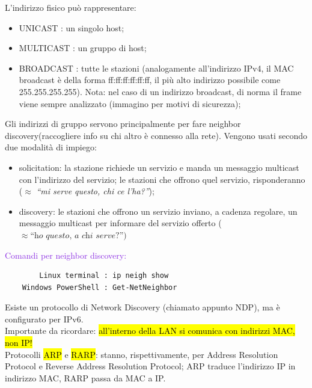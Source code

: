 \noindent L'indirizzo fisico può rappresentare:
\begin{itemize}
    \item UNICAST : un singolo host;
    \item MULTICAST : un gruppo di host;
    \item BROADCAST : tutte le stazioni (analogamente all'indirizzo IPv4, il MAC broadcast è della forma ff:ff:ff:ff:ff:ff, il più alto indirizzo possibile come 255.255.255.255). Nota: nel caso di un indirizzo broadcast, di norma il frame viene sempre analizzato (immagino per motivi di sicurezza);
\end{itemize}

\noindent Gli indirizzi di gruppo servono principalmente per fare neighbor discovery(raccogliere info su chi altro è connesso alla rete). Vengono usati secondo due modalità di impiego:
\begin{itemize}
    \item solicitation: la stazione richiede un servizio e manda un messaggio multicast con l'indirizzo del servizio; le stazioni che offrono quel servizio, risponderanno ($\approx$ \textit{``mi serve questo, chi ce l'ha?''});
    \item discovery: le stazioni che offrono un servizio inviano, a cadenza regolare, un messaggio multicast per informare del servizio offerto ($\approx \textit{``ho questo, a chi serve?''})$
\end{itemize}

\noindent \textcolor{BlueViolet}{Comandi per neighbor discovery:}
\begin{verbatim}
        Linux terminal : ip neigh show
    Windows PowerShell : Get-NetNeighbor
\end{verbatim}

\noindent Esiste un protocollo di Network Discovery (chiamato appunto NDP), ma è configurato per IPv6.\\
\noindent Importante da ricordare: \hl{all'interno della LAN si comunica con indirizzi MAC, non IP!}\\
\noindent Protocolli \hl{ARP} e \hl{RARP}: stanno, rispettivamente, per Address Resolution Protocol e Reverse Address Resolution Protocol; ARP traduce l'indirizzo IP in indirizzo MAC, RARP passa da MAC a IP.

